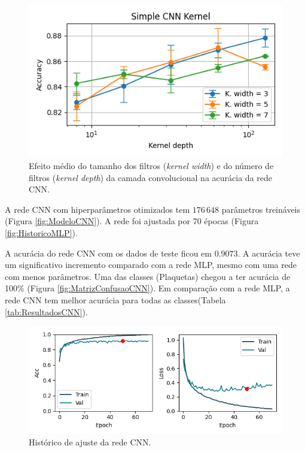 \documentclass[final,5p]{elsarticle}
\numberwithin{equation}{section}
\begin{document}
     \begin{figure}[hbt!]
         \includegraphics[width=0.95\columnwidth]{CNN_kernel.png}
         \caption{Efeito médio do tamanho dos filtros (\emph{kernel width}) e do número de filtros (\emph{kernel depth}) da camada convolucional na acurácia da rede CNN.}\label{fig:KernelCNN}
     \end{figure}

     A rede CNN com hiperparâmetros otimizados tem $176\,648$ parâmetros treináveis (Figura \ref{fig:ModeloCNN}). A rede foi ajustada por 70 épocas (Figura \ref{fig:HistoricoMLP}).

     A acurácia do rede CNN com os dados de teste ficou em $0.9073$. A acurácia teve um significativo incremento comparado com a rede MLP, mesmo com uma rede com menos parâmetros. Uma das classes (Plaquetas) chegou a ter acurácia de 100\% (Figura \ref{fig:MatrizConfusaoCNN}). Em comparação com a rede MLP, a rede CNN tem melhor acurácia para todas as classes(Tabela \ref{tab:ResultadosCNN}).

    \begin{figure}[hbt!]
        \includegraphics[width=0.95\columnwidth]{CNN_Simple_history_cropped.png}
        \caption{Histórico de ajuste da rede CNN.}\label{fig:HistoricoCNN}
    \end{figure}
\end{document}
